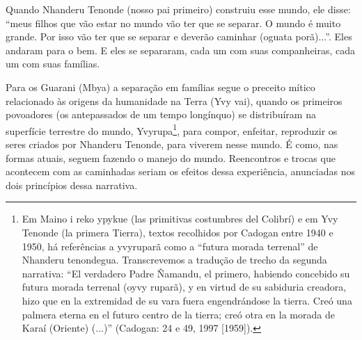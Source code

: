 \documentclass{article}
\begin{document}
Quando Nhanderu Tenonde (nosso pai primeiro) construiu esse mundo, ele
disse: {\textquotedblleft}meus filhos que v\~ao estar no mundo v\~ao
ter que se separar. O mundo \'e muito grande. Por isso v\~ao ter que se
separar e dever\~ao caminhar (oguata por\~a)...{\textquotedblright}.
Eles andaram para o bem. E eles se separaram, cada um com suas
companheiras, cada um com suas fam\'ilias. 

Para os Guarani (Mbya) a separa\c{c}\~ao em fam\'ilias segue o preceito
m\'itico relacionado \`as origens da humanidade na Terra (Yvy vai),
quando os primeiros povoadores (os antepassados de um tempo
long\'inquo) se distribu\'iram na superf\'icie terrestre do mundo,
Yvyrupa\footnote{ Em Maino i reko ypykue (las primitivas costumbres del
Colibr\'i) e em Yvy Tenonde (la primera Tierra), textos recolhidos por
Cadogan entre 1940 e 1950, h\'a refer\^encias a yvyrupar\~a como a
{\textquotedblleft}futura morada terrenal{\textquotedblright} de
Nhanderu tenondegua. Transcrevemos a tradu\c{c}\~ao de trecho da
segunda narrativa: {\textquotedblleft}El verdadero Padre \~Namandu, el
primero, habiendo concebido su futura morada terrenal (oyvy rupar\~a),
y en virtud de su sabiduria creadora, hizo que en la extremidad de su
vara fuera engendr\'andose la tierra. Cre\'o una palmera eterna en el
futuro centro de la tierra; cre\'o otra en la morada de Kara\'i
(Oriente) (...){\textquotedblright} (Cadogan: 24 e 49, 1997 [1959]).},
para compor, enfeitar, reproduzir os seres criados por Nhanderu
Tenonde, para viverem nesse mundo.  \'E como, nas formas atuais, seguem
fazendo o manejo do mundo. Reencontros e trocas que acontecem com as
caminhadas seriam os efeitos dessa experi\^encia, anunciadas nos dois
princ\'ipios dessa narrativa.
\end{document}
